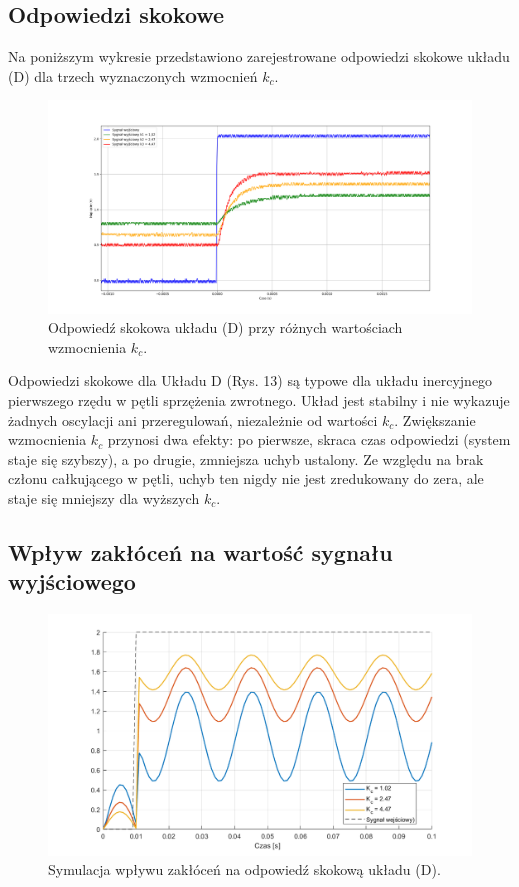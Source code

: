 \documentclass[12pt,a4paper]{article}
\begin{document}
	\subsection{Odpowiedzi skokowe}
	Na poniższym wykresie przedstawiono zarejestrowane odpowiedzi skokowe układu (D) dla trzech wyznaczonych wzmocnień \(k_c\).
	
	\begin{figure}[H]
	\centering
	\includegraphics[width=1\linewidth]{zdjecia/OdpSkokD.png}
	\caption{Odpowiedź skokowa układu (D) przy różnych wartościach wzmocnienia \(k_c\).}
	\label{fig:OdpSkokD}
	\end{figure}
	
	Odpowiedzi skokowe dla Układu D (Rys. 13) są typowe dla układu inercyjnego pierwszego rzędu w pętli sprzężenia zwrotnego. Układ jest stabilny i nie wykazuje żadnych oscylacji ani przeregulowań, niezależnie od wartości $k_c$. Zwiększanie wzmocnienia $k_c$ przynosi dwa efekty: po pierwsze, skraca czas odpowiedzi (system staje się szybszy), a po drugie, zmniejsza uchyb ustalony. Ze względu na brak członu całkującego w pętli, uchyb ten nigdy nie jest zredukowany do zera, ale staje się mniejszy dla wyższych $k_c$.
	
	\subsection{Wpływ zakłóceń na wartość sygnału wyjściowego}
	
	\begin{figure}[H]
		\centering
		\includegraphics[width=0.8\linewidth]{zdjecia/symOdpSkokD.png}
		\caption{Symulacja wpływu zakłóceń na odpowiedź skokową układu (D).}
		\label{fig:odp_ukladu_D_z_zakloceniami}
	\end{figure}
	
\end{document}
